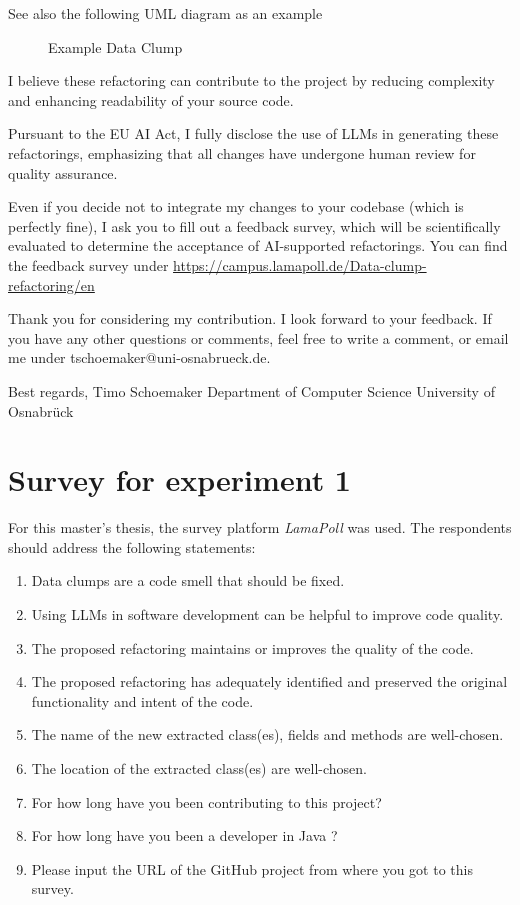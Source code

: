 \begin{appendices}
See also the following UML diagram as an example
\begin{figure}[htpb!]
    \centering
    
    \caption{Example Data Clump}
    \label{fig:enter-label}
\end{figure}
    



I believe these refactoring can contribute to the project by reducing complexity and enhancing readability of your source code.

Pursuant to the EU AI Act, I fully disclose the use of LLMs in generating these refactorings, emphasizing that all changes have undergone human review for quality assurance. 


Even if you decide not to integrate my changes to your codebase (which is perfectly fine), I ask you to fill out a feedback survey, which will be scientifically evaluated to determine the acceptance of AI-supported refactorings. You can find the feedback survey under \url{https://campus.lamapoll.de/Data-clump-refactoring/en}


Thank you for considering my contribution. I look forward to your feedback. If you have any other questions or comments, feel free to write a comment, or email me under tschoemaker@uni-osnabrueck.de.
\newline

Best regards,\newline
Timo Schoemaker \newline
Department of Computer Science \newline
University of Osnabrück \newline


\chapter{Survey for experiment 1}\label{app:pr_survey}

For this master's thesis, the survey platform \textit{LamaPoll} \cite{lamapoll} was used.  The respondents should address the following statements:
\begin{enumerate}
\item Data clumps are a code smell that should be fixed.
\item Using LLMs in software development can be helpful to improve code quality.
\item The proposed refactoring maintains or improves the quality of the code.
\item The proposed refactoring has  adequately identified and preserved the original functionality and intent of the code.
\item The name of the new extracted class(es), fields and methods are well-chosen.
 \item The location of the extracted class(es) are well-chosen.
 \item For how long have you been contributing to this project?
\item For how long have you been a developer in Java ? 
\item Please input the URL of the GitHub project from where you got to this survey.


\end{enumerate}
\end{appendices}
